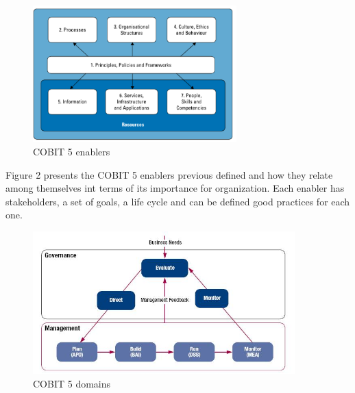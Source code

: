 \begin{figure}
\centering
\includegraphics[width=0.7\textwidth]{img/Enablers.png}
\caption{COBIT 5 enablers}
\end{figure}

Figure 2 presents the COBIT 5 enablers previous defined and how they relate among themselves int terms of its importance for organization. Each enabler has stakeholders, a set of goals, a life cycle and can be defined good practices for each one.\par

\begin{figure}
\centering
\includegraphics[width=0.9\textwidth]{img/COBITProcesses.jpg}
\caption{COBIT 5 domains}
\end{figure}

